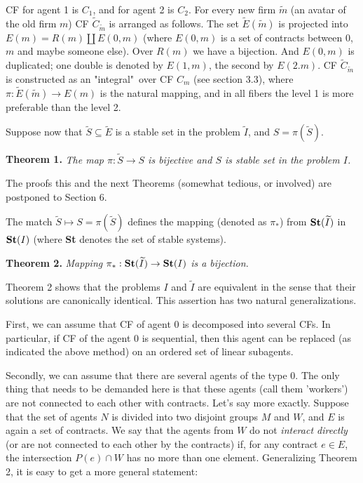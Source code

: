 \documentclass[12pt,a4paper]{article}
\begin{document}
CF for agent 1 is $C_1$, and for agent 2 is $C_2$. For every new firm $\widetilde m$ (an avatar of the old firm $m$) CF $\widetilde C_{\widetilde m}$ is arranged as follows. The set $\widetilde E(\widetilde m)$ is projected into $E(m)=R(m)\coprod E(0,m)$ (where $E(0,m)$ is a set of contracts between 0, $m$ and maybe someone else). Over $R(m)$ we have a bijection. And $E(0,m)$ is duplicated; one double is denoted by $E(1,m)$, the second by $E(2.m)$. CF $\widetilde C_{\widetilde m}$ is constructed as an "integral"\ over CF $C_m$ (see section 3.3), where $\pi: \widetilde{E}(\widetilde{m}) \to E(m)$ is the natural mapping, and in all fibers the level 1 is more preferable than the level 2.

Suppose now that $\widetilde S \subseteq \widetilde E$ is a stable set in the problem $\widetilde I$, and $S=\pi (\widetilde S)$.\medskip


\textbf{Theorem 1.} \emph{The map $\pi :\widetilde S\to S$ is bijective and $S$ is stable set in the problem $I$.}\medskip

The proofs this and the next Theorems  (somewhat tedious, or involved) are postponed to Section 6.

The match $\widetilde  S\mapsto S=\pi (\widetilde S)$ defines the mapping (denoted as $\pi _*$) from ${\bf St}(\widetilde I)$ in ${\bf St}(I)$ (where {\bf St} denotes the set of stable systems).\medskip

\textbf{Theorem 2.} \emph{Mapping $\pi_*:{\bf St}(\widetilde I) \to  {\bf       St}(I)$ is a bijection.}\medskip

Theorem 2 shows that the problems $I$ and $\widetilde I$ are equivalent in the sense that their solutions are canonically identical. This assertion has two natural generalizations.

First, we can assume that CF of agent 0 is decomposed into several CFs. In particular, if CF of the agent 0 is sequential, then this agent can be replaced (as indicated the above method) on an ordered set of linear subagents.

Secondly, we can assume that there are several agents of the type 0. The only thing that needs to be demanded here is that these agents (call them 'workers') are not connected to each other with contracts. Let's say more exactly. Suppose that the set of agents $N$ is divided into two disjoint groups $M$ and $W$, and $E$ is again a set of contracts. We say that the agents from $W$ do not \emph{interact directly} (or are not connected to each other by the contracts) if, for any contract $e\in E$, the intersection $P(e)\cap W$ has  no more than one element. Generalizing Theorem 2, it is easy to get a more general statement:\medskip
\end{document}
